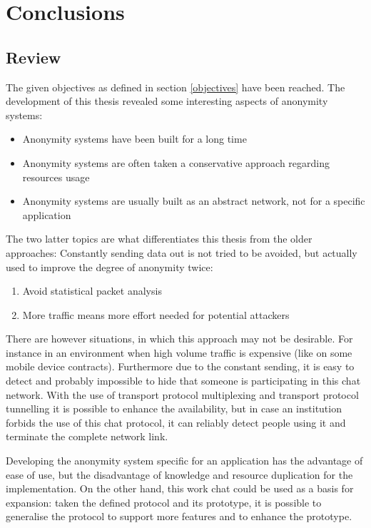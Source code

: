 \chapter{Conclusions}
\section{Review}
The given objectives as defined in section
\ref{objectives} have been reached. 
The development of this thesis revealed some interesting aspects
of anonymity systems:
\begin{itemize}
\item Anonymity systems have been built for a long time
\item Anonymity systems are often taken a conservative approach regarding resources usage
\item Anonymity systems are usually built as an abstract network, not for a specific application
\end{itemize}
The two latter topics are what differentiates this thesis from the older
approaches: Constantly sending data out is not tried to be avoided, but
actually used to improve the degree of anonymity twice:
\begin{enumerate}
\item Avoid statistical packet analysis
\item More traffic means more effort needed for potential attackers
\end{enumerate}
There are however situations, in which this approach may not be desirable.
For instance in an environment when high volume traffic is expensive
(like on some mobile device contracts).
Furthermore due to the constant sending, it is easy to detect and probably
impossible to hide that someone is participating in this chat network.
With the use of transport protocol multiplexing and transport protocol
tunnelling it is possible to enhance the availability, but in case an
institution forbids the use of this chat protocol, it can reliably
detect people using it and terminate the complete network link.

Developing the anonymity system specific for an application has the advantage
of ease of use, but the disadvantage of knowledge and resource duplication
for the implementation. On the other hand, this work
chat could be used as a basis for expansion: taken the
defined protocol and its prototype, it is possible to generalise
the protocol to support more features and to enhance the prototype.
